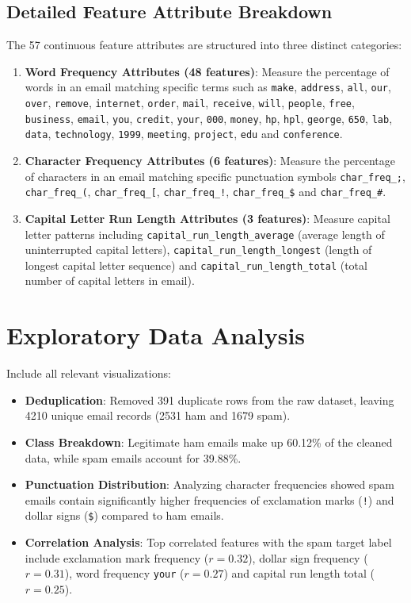 \documentclass[12pt,a4paper]{article}
\begin{document}
\subsection*{Detailed Feature Attribute Breakdown}
The 57 continuous feature attributes are structured into three distinct categories:
\begin{enumerate}
\item \textbf{Word Frequency Attributes (48 features)}: Measure the percentage of words in an email matching specific terms such as \texttt{make}, \texttt{address}, \texttt{all}, \texttt{our}, \texttt{over}, \texttt{remove}, \texttt{internet}, \texttt{order}, \texttt{mail}, \texttt{receive}, \texttt{will}, \texttt{people}, \texttt{free}, \texttt{business}, \texttt{email}, \texttt{you}, \texttt{credit}, \texttt{your}, \texttt{000}, \texttt{money}, \texttt{hp}, \texttt{hpl}, \texttt{george}, \texttt{650}, \texttt{lab}, \texttt{data}, \texttt{technology}, \texttt{1999}, \texttt{meeting}, \texttt{project}, \texttt{edu} and \texttt{conference}.
\item \textbf{Character Frequency Attributes (6 features)}: Measure the percentage of characters in an email matching specific punctuation symbols \texttt{char\_freq\_;}, \texttt{char\_freq\_(}, \texttt{char\_freq\_[}, \texttt{char\_freq\_!}, \texttt{char\_freq\_\$} and \texttt{char\_freq\_\#}.
\item \textbf{Capital Letter Run Length Attributes (3 features)}: Measure capital letter patterns including \texttt{capital\_run\_length\_average} (average length of uninterrupted capital letters), \texttt{capital\_run\_length\_longest} (length of longest capital letter sequence) and \texttt{capital\_run\_length\_total} (total number of capital letters in email).
\end{enumerate}

\section{Exploratory Data Analysis}
Include all relevant visualizations:
\begin{itemize}
\item \textbf{Deduplication}: Removed 391 duplicate rows from the raw dataset, leaving 4210 unique email records (2531 ham and 1679 spam).
\item \textbf{Class Breakdown}: Legitimate ham emails make up 60.12\% of the cleaned data, while spam emails account for 39.88\%.
\item \textbf{Punctuation Distribution}: Analyzing character frequencies showed spam emails contain significantly higher frequencies of exclamation marks (\texttt{!}) and dollar signs (\texttt{\$}) compared to ham emails.
\item \textbf{Correlation Analysis}: Top correlated features with the spam target label include exclamation mark frequency ($r = 0.32$), dollar sign frequency ($r = 0.31$), word frequency \texttt{your} ($r = 0.27$) and capital run length total ($r = 0.25$).
\end{itemize}
\end{document}
